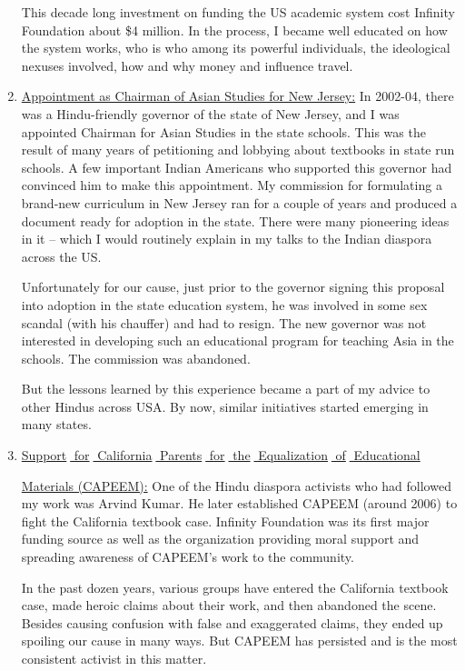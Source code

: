 \begin{enumerate}
This decade long investment on funding the US academic system cost Infinity Foundation about \$4 million. In the process, I became well educated on how the system works, who is who among its powerful individuals, the ideological nexuses involved, how and why money and influence travel.

\item \underline{Appointment as Chairman of Asian Studies for New Jersey:} In 2002-04, there was a Hindu-friendly governor of the state of New Jersey, and I was appointed Chairman for Asian Studies in the state schools. This was the result of many years of petitioning and lobbying about textbooks in state run schools. A few important Indian Americans who supported this governor had convinced him to make this appointment. My commission for formulating a brand-new curriculum in New Jersey ran for a couple of years and produced a document ready for adoption in the state. There were many pioneering ideas in it – which I would routinely explain in my talks to the Indian diaspora across the US.

Unfortunately for our cause, just prior to the governor signing this proposal into adoption in the state education system, he was involved in some sex scandal (with his chauffer) and had to resign. The new governor was not interested in developing such an educational program for teaching Asia in the schools. The commission was abandoned. 

But the lessons learned by this experience became a part of my advice to other Hindus across USA. By now, similar initiatives started emerging in many states. 

\item \underline{Support$\;$ for$\;$ California$\;$ Parents$\;$ for$\;$ the$\;$ Equalization$\;$ of$\;$ Educational} 

\underline{Materials (CAPEEM):} One of the Hindu diaspora activists who had followed my work was Arvind Kumar. He later established CAPEEM (around 2006) to fight the California textbook case. Infinity Foundation was its first major funding source as well as the organization providing moral support and spreading awareness of CAPEEM’s work to the community.

In the past dozen years, various groups have entered the California textbook case, made heroic claims about their work, and then abandoned the scene. Besides causing confusion with false and exaggerated claims, they ended up spoiling our cause in many ways. But CAPEEM has persisted and is the most consistent activist in this matter.


\end{enumerate}
